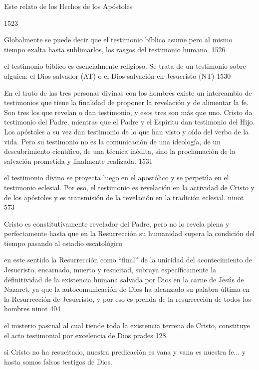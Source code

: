 Este relato de los Hechos de los Apóstoles

1523

Globalmente se puede decir que el testimonio bíblico asume pero al mismo tiempo
exalta hasta sublimarlos, los rasgos del testimonio humano. 1526

el testimonio bíblico es esencialmente religioso. Se trata de un testimonio
sobre alguien: el Dios salvador (AT) o el Dios-salvación-en-Jesucristo (NT) 1530


En el trato de las tres personas divinas con los hombres existe un intercambio
de testimonios que tiene la finalidad de proponer la revelación y de alimentar
la fe. Son tres los que revelan o dan testimonio, y esos tres son más que uno.
Cristo da testimonio del Padre, mientras que el Padre y el Espíritu dan
testimonio del Hijo. Los apóstoles a su vez dan testimonio de lo que han visto y
oído del verbo de la vida. Pero su testimonio no es la comunicación de una
ideología, de un descubrimiento científico, de una técnica inédita, sino la
proclamación de la salvación prometida y finalmente realizada. 1531

el testimonio divino se proyecta luego en el apostólico y se perpetúa en el
testimonio eclesial. Por eso, el testimonio es revelación en la actividad de
Cristo y de los apóstoles y es transmisión de la revelación en la tradición
eclesial. ninot 573

Cristo es constitutivamente revelador del Padre, pero no lo revela plena y
perfectamente hasta que en la Resurrección su humanidad supera la condición del
tiempo pasando al estadio escatológico

en este sentido la Resurrección como ``final'' de la unicidad del acontecimiento
de Jesucristo, encarnado, muerto y resucitad, subraya específicamente la
definitividad de la existencia humana salvada por Dios en la carne de Jesús de
Nazaret, ya que la autocomunicación de Dios ha alcanzado su palabra última en la
Resurrección de Jesucristo, y por eso es prenda de la resurrección de todos los
hombres ninot 404

el misterio pascual al cual tiende toda la existencia terrena de Cristo,
constituye el acto testimonial por excelencia de Dios prades 128

si Cristo no ha resucitado, nuestra predicación es vana y vana es nuestra fe...
y hasta somos falsos testigos de Dios.

